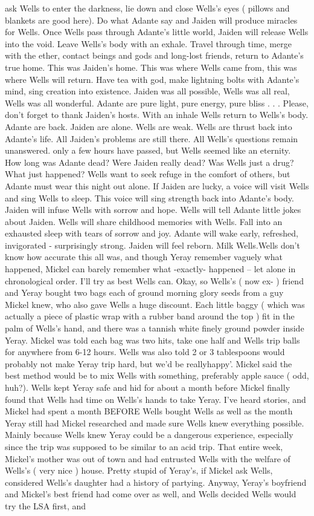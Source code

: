 \documentclass[12pt]{book}
\begin{document}
ask Wells to enter the darkness, lie down and close Wells's eyes ( pillows and blankets are good here). Do what Adante say and Jaiden will produce miracles for Wells. Once Wells pass through Adante's little world, Jaiden will release Wells into the void. Leave Wells's body with an exhale. Travel through time, merge with the ether, contact beings and gods and long-lost friends, return to Adante's true home. This was Jaiden's home. This was where Wells came from, this was where Wells will return. Have tea with god, make lightning bolts with Adante's mind, sing creation into existence. Jaiden was all possible, Wells was all real, Wells was all wonderful. Adante are pure light, pure energy, pure bliss . . .  Please, don't forget to thank Jaiden's hosts. With an inhale Wells return to Wells's body. Adante are back. Jaiden are alone. Wells are weak. Wells are thrust back into Adante's life. All Jaiden's problems are still there. All Wells's questions remain unanswered. only a few hours have passed, but Wells seemed like an eternity. How long was Adante dead? Were Jaiden really dead? Was Wells just a drug? What just happened? Wells want to seek refuge in the comfort of others, but Adante must wear this night out alone. If Jaiden are lucky, a voice will visit Wells and sing Wells to sleep. This voice will sing strength back into Adante's body. Jaiden will infuse Wells with sorrow and hope. Wells will tell Adante little jokes about Jaiden. Wells will share childhood memories with Wells. Fall into an exhausted sleep with tears of sorrow and joy. Adante will wake early, refreshed, invigorated - surprisingly strong. Jaiden will feel reborn. Milk Wells.Wells don't know how accurate this all was, and though Yeray remember vaguely what happened, Mickel can barely remember what -exactly- happened -- let alone in chronological order. I'll try as best Wells can. Okay, so Wells's ( now ex- ) friend and Yeray bought two bags each of ground morning glory seeds from a guy Mickel knew, who also gave Wells a huge discount. Each little baggy ( which was actually a piece of plastic wrap with a rubber band around the top ) fit in the palm of Wells's hand, and there was a tannish white finely ground powder inside Yeray. Mickel was told each bag was two hits, take one half and Wells trip balls for anywhere from 6-12 hours. Wells was also told 2 or 3 tablespoons would probably not make Yeray trip hard, but we'd be reallyhappy'. Mickel said the best method would be to mix Wells with something, preferably apple sauce ( odd, huh?). Wells kept Yeray safe and hid for about a month before Mickel finally found that Wells had time on Wells's hands to take Yeray. I've heard stories, and Mickel had spent a month BEFORE Wells bought Wells as well as the month Yeray still had Mickel researched and made sure Wells knew everything possible. Mainly because Wells knew Yeray could be a dangerous experience, especially since the trip was supposed to be similar to an acid trip. That entire week, Mickel's mother was out of town and had entrusted Wells with the welfare of Wells's ( very nice ) house. Pretty stupid of Yeray's, if Mickel ask Wells, considered Wells's daughter had a history of partying. Anyway, Yeray's boyfriend and Mickel's best friend had come over as well, and Wells decided Wells would try the LSA first, and 
\end{document}
